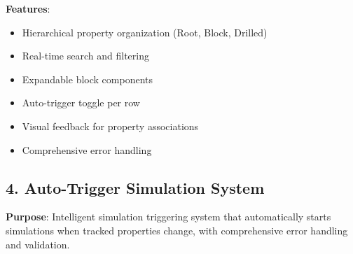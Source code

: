 \documentclass[12pt,a4paper]{article}
\begin{document}
\textbf{Features}:
\begin{itemize}
    \item Hierarchical property organization (Root, Block, Drilled)
    \item Real-time search and filtering
    \item Expandable block components
    \item Auto-trigger toggle per row
    \item Visual feedback for property associations
    \item Comprehensive error handling
\end{itemize}

\subsection{4. Auto-Trigger Simulation System}

\textbf{Purpose}: Intelligent simulation triggering system that automatically starts simulations when tracked properties change, with comprehensive error handling and validation.
\end{document}
